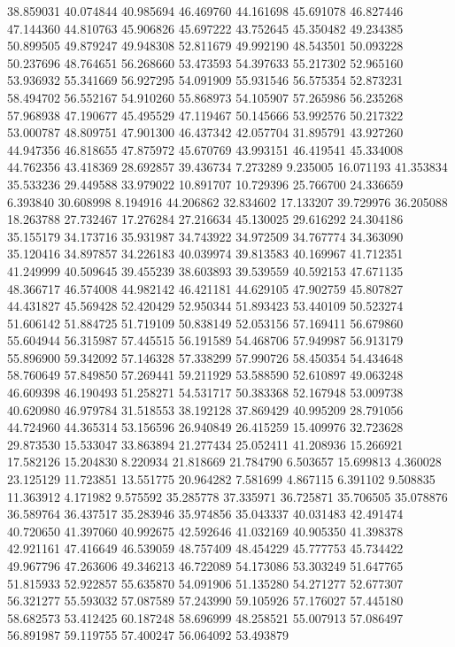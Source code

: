 38.859031
40.074844
40.985694
46.469760
44.161698
45.691078
46.827446
47.144360
44.810763
45.906826
45.697222
43.752645
45.350482
49.234385
50.899505
49.879247
49.948308
52.811679
49.992190
48.543501
50.093228
50.237696
48.764651
56.268660
53.473593
54.397633
55.217302
52.965160
53.936932
55.341669
56.927295
54.091909
55.931546
56.575354
52.873231
58.494702
56.552167
54.910260
55.868973
54.105907
57.265986
56.235268
57.968938
47.190677
45.495529
47.119467
50.145666
53.992576
50.217322
53.000787
48.809751
47.901300
46.437342
42.057704
31.895791
43.927260
44.947356
46.818655
47.875972
45.670769
43.993151
46.419541
45.334008
44.762356
43.418369
28.692857
39.436734
7.273289
9.235005
16.071193
41.353834
35.533236
29.449588
33.979022
10.891707
10.729396
25.766700
24.336659
6.393840
30.608998
8.194916
44.206862
32.834602
17.133207
39.729976
36.205088
18.263788
27.732467
17.276284
27.216634
45.130025
29.616292
24.304186
35.155179
34.173716
35.931987
34.743922
34.972509
34.767774
34.363090
35.120416
34.897857
34.226183
40.039974
39.813583
40.169967
41.712351
41.249999
40.509645
39.455239
38.603893
39.539559
40.592153
47.671135
48.366717
46.574008
44.982142
46.421181
44.629105
47.902759
45.807827
44.431827
45.569428
52.420429
52.950344
51.893423
53.440109
50.523274
51.606142
51.884725
51.719109
50.838149
52.053156
57.169411
56.679860
55.604944
56.315987
57.445515
56.191589
54.468706
57.949987
56.913179
55.896900
59.342092
57.146328
57.338299
57.990726
58.450354
54.434648
58.760649
57.849850
57.269441
59.211929
53.588590
52.610897
49.063248
46.609398
46.190493
51.258271
54.531717
50.383368
52.167948
53.009738
40.620980
46.979784
31.518553
38.192128
37.869429
40.995209
28.791056
44.724960
44.365314
53.156596
26.940849
26.415259
15.409976
32.723628
29.873530
15.533047
33.863894
21.277434
25.052411
41.208936
15.266921
17.582126
15.204830
8.220934
21.818669
21.784790
6.503657
15.699813
4.360028
23.125129
11.723851
13.551775
20.964282
7.581699
4.867115
6.391102
9.508835
11.363912
4.171982
9.575592
35.285778
37.335971
36.725871
35.706505
35.078876
36.589764
36.437517
35.283946
35.974856
35.043337
40.031483
42.491474
40.720650
41.397060
40.992675
42.592646
41.032169
40.905350
41.398378
42.921161
47.416649
46.539059
48.757409
48.454229
45.777753
45.734422
49.967796
47.263606
49.346213
46.722089
54.173086
53.303249
51.647765
51.815933
52.922857
55.635870
54.091906
51.135280
54.271277
52.677307
56.321277
55.593032
57.087589
57.243990
59.105926
57.176027
57.445180
58.682573
53.412425
60.187248
58.696999
48.258521
55.007913
57.086497
56.891987
59.119755
57.400247
56.064092
53.493879
